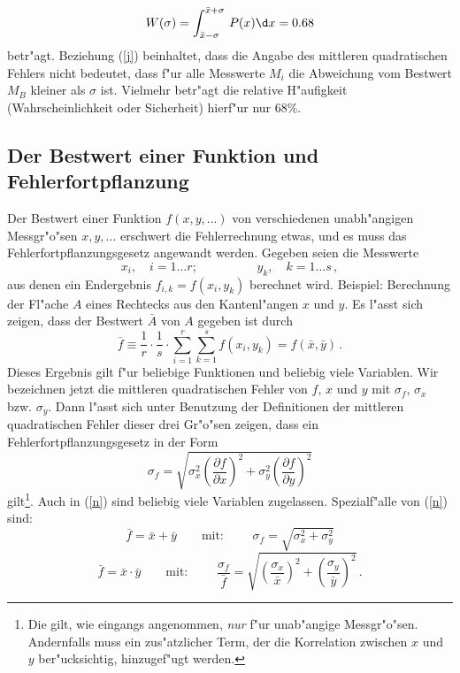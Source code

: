 \begin{equation} \label{j}
  W(\sigma) = \int_{\bar{x}-\sigma}^{\bar{x}+\sigma} \, P(x) \d x =
  0.68
\end{equation}
%
betr"agt. Beziehung (\ref{j}) beinhaltet, dass die Angabe des
mittleren quadratischen Fehlers nicht bedeutet, dass f"ur alle
Messwerte $M_i$ die Abweichung vom Bestwert $M_B$ kleiner als
$\sigma$ ist. Vielmehr betr"agt die relative H"aufigkeit
(Wahrscheinlichkeit oder Sicherheit) hierf"ur nur 68\%.


\subsection{Der Bestwert einer Funktion und Fehlerfortpflanzung}

Der Bestwert einer Funktion $f(x,y,...)$ von verschiedenen
unabh"angigen Messgr"o"sen $x,y,...$ erschwert die Fehlerrechnung
etwas, und es muss das
Fehlerfortpflanzungsgesetz
angewandt werden. Gegeben seien die Messwerte
%
\begin{equation} \label{l}
  x_{i},\quad i=1\ldots r; \hspace{2cm} y_{k},\quad k=1\ldots s \,
  ,
\end{equation}
%
aus denen ein Endergebnis $f_{i,k}=f(x_{i},y_{k})$ berechnet wird.
Beispiel: Berechnung der Fl"ache $A$ eines Rechtecks aus den
Kantenl"angen $x$ und $y$. Es l"asst sich zeigen, dass der Bestwert
$\bar A$ von $A$ gegeben ist durch
%
\begin{equation} \label{m}
 \bar f \equiv  \frac{1}{r} \cdot \frac{1}{s} \cdot
  \sum_{i=1}^{r} \sum_{k=1}^{s} f(x_{i},y_{k}) = f(\bar x, \bar y)
  \, .
\end{equation}
%
Dieses Ergebnis gilt f"ur beliebige Funktionen und beliebig viele
Variablen. Wir bezeichnen jetzt die mittleren quadratischen Fehler
von $f$, $x$ und $y$ mit $\sigma_f$, $\sigma_x$ bzw. $\sigma_y$.
Dann l"asst sich unter Benutzung der Definitionen der mittleren
quadratischen Fehler dieser drei Gr"o"sen zeigen, dass ein
Fehlerfortpflanzungsgesetz in der Form
%
\begin{equation} \label{n}
 \sigma_{f} =
   \sqrt{\sigma_{x}^{2} \left( \frac{\partial f}{\partial x} \right)^{2}
    +
         \sigma_{y}^{2} \left( \frac{\partial f}{\partial y} \right)^{2}
   }
\end{equation}
%
gilt\footnote{Die gilt, wie eingangs angenommen, {\it nur} f"ur unab"angige
Messgr"o"sen. Andernfalls muss ein zus"atzlicher Term, der die Korrelation
zwischen $x$ und $y$ ber"ucksichtig, hinzugef"ugt werden.}. 
Auch in (\ref{n}) sind beliebig viele Variablen zugelassen.
Spezialf"alle von (\ref{n}) sind:
%
\begin{equation} \label{o}
  \bar f = \bar x + \bar y \qquad \mbox{mit: } \qquad
  \sigma_{f} = \sqrt{\sigma_{x}^{2} + \sigma_{y}^{2}}
\end{equation}
%
\begin{equation} \label{q}
  \bar f = \bar x \cdot \bar y \qquad \mbox{mit: } \qquad
  \frac{\sigma_{f}}{\bar f}  = \sqrt{\left(\frac{\sigma_{x}}{\bar
 x}\right)^{2} + \left(\frac{\sigma_{y}}{\bar y}\right)^{2}} \, .
\end{equation}
%
%


